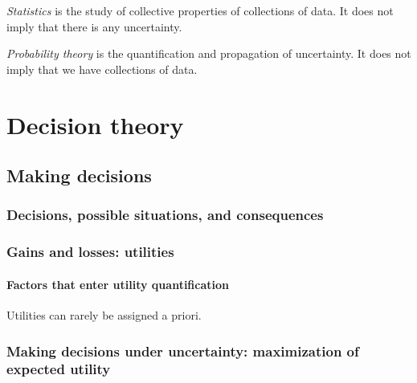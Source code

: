 \documentclass[
  a4paper,
  DIV=11,
  numbers=noendperiod,
  oneside]{scrreprt}
\begin{document}
\emph{Statistics} is the study of collective properties of collections
of data. It does not imply that there is any uncertainty.

\emph{Probability theory} is the quantification and propagation of
uncertainty. It does not imply that we have collections of data.

\part{Decision theory}

\hypertarget{making-decisions}{%
\chapter{Making decisions}\label{making-decisions}}

\hypertarget{decisions-possible-situations-and-consequences}{%
\section{Decisions, possible situations, and
consequences}\label{decisions-possible-situations-and-consequences}}

\hypertarget{gains-and-losses-utilities}{%
\section{Gains and losses: utilities}\label{gains-and-losses-utilities}}

\hypertarget{factors-that-enter-utility-quantification}{%
\subsection{Factors that enter utility
quantification}\label{factors-that-enter-utility-quantification}}

Utilities can rarely be assigned a priori.

\hypertarget{making-decisions-under-uncertainty-maximization-of-expected-utility}{%
\section{Making decisions under uncertainty: maximization of expected
utility}\label{making-decisions-under-uncertainty-maximization-of-expected-utility}}
\end{document}
